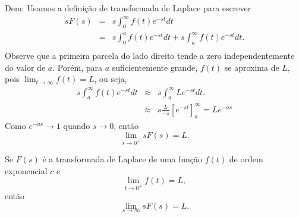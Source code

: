 \documentclass[a4paper,10pt]{book}
\begin{document}
Dem: Usamos a definição de transformada de Laplace para escrever
\begin{eqnarray*}
sF(s)&=&s\int_0^\infty f(t)e^{-st}dt\\
&=&s\int_0^a f(t)e^{-st}dt+s\int_a^\infty f(t)e^{-st}dt.\\
\end{eqnarray*}
Observe que a primeira parcela do lado direito tende a zero independentemente do valor de $a$. Porém, para $a$ suficientemente grande, $f(t)$ se aproxima de $L$, pois $\displaystyle \lim_{t\to\infty}f(t)=L$, ou seja,
\begin{eqnarray*}
s\int_a^\infty f(t)e^{-st}dt &\approx &s\int_a^\infty L e^{-st}dt.\\
&\approx &s\frac{L}{-s}\left[ e^{-st}\right]_a^\infty=Le^{-as}
\end{eqnarray*}
Como $e^{-as}\to 1$ quando $s\to 0$, então
\begin{equation}
\lim_{s\to 0^+} sF(s)=L.
\end{equation} 




Se $F(s)$ é a transformada de Laplace de uma função $f(t)$ de ordem exponencial $c$ e 
\begin{equation}
\lim_{t\to 0^+}f(t)=L,
\end{equation}
então
\begin{equation}
\lim_{s\to \infty} sF(s)=L.
\end{equation}
\end{document}
